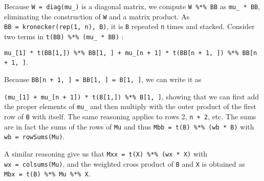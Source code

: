 \documentclass[
  letterpaper,
  DIV=11,
  numbers=noendperiod]{scrartcl}
\begin{document}
Because \texttt{W\ =\ diag(mu\_)} is a diagonal matrix, we compute
\texttt{W\ \%*\%\ BB} as \texttt{mu\_\ *\ BB}, eliminating the
construction of \texttt{W} and a matrix product. As
\texttt{BB\ =\ kronecker(rep(1,\ n),\ B)}, it is \texttt{B} repeated
\texttt{n} times and stacked. Consider two terms in
\texttt{t(BB)\ \%*\%\ (mu\_\ *\ BB)} :

\texttt{mu\_{[}1{]}\ *\ t(BB{[}1,{]})\ \%*\%\ BB{[}1,\ {]}\ +\ mu\_{[}n\ +\ 1{]}\ *\ t(BB{[}n\ +\ 1,\ {]})\ \%*\%\ BB{[}n\ +\ 1,\ {]}}.

Because \texttt{BB{[}n\ +\ 1,\ {]}\ =\ BB{[}1,\ {]}\ =\ B{[}1,\ {]}}, we
can write it as

\texttt{(mu\_{[}1{]}\ +\ mu\_{[}n\ +\ 1{]})\ *\ t(B{[}1,{]})\ \%*\%\ B{[}1,\ {]}},
showing that we can first add the proper elements of \texttt{mu\_} and
then multiply with the outer product of the first row of \texttt{B} with
itself. The same reasoning applies to rows 2, \texttt{n\ +\ 2}, etc. The
sums are in fact the sums of the rows of \texttt{Mu} and thus
\texttt{Mbb\ =\ t(B)\ \%*\%\ (wb\ *\ B)} with
\texttt{wb\ =\ rowSums(Mu)}.

A similar reasoning give us that
\texttt{Mxx\ =\ t(X)\ \%*\%\ (wx\ *\ X)} with
\texttt{wx\ =\ colsums(Mu)}, and the weighted cross product of
\texttt{B} and \texttt{X} is obtained as
\texttt{Mbx\ =\ t(B)\ \%*\%\ Mu\ \%*\%\ X}.
\end{document}
